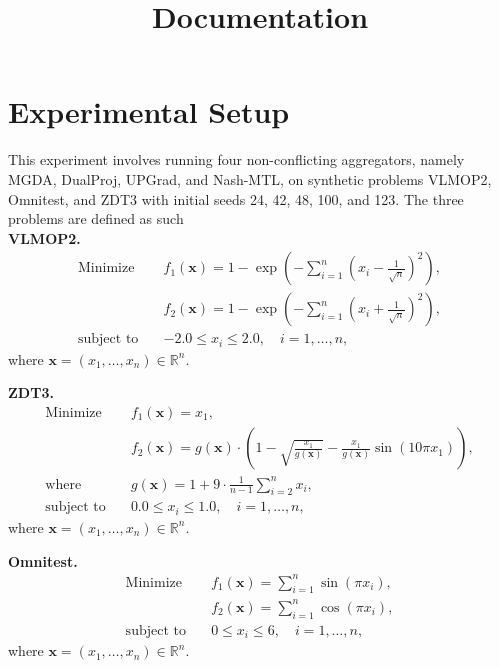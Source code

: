 \documentclass{article}
\title{Documentation}
\renewcommand{\|}{\biggr|}
\begin{document}
\maketitle
    \section{Experimental Setup}
    This experiment involves running four non-conflicting aggregators, namely MGDA, DualProj, UPGrad, and Nash-MTL, on synthetic problems VLMOP2, Omnitest, and ZDT3 with initial seeds 24, 42, 48, 100, and 123. The three problems are defined as such\\
    \textbf{VLMOP2.} 
    \begin{align*}
    \text{Minimize} \quad & f_1(\mathbf{x}) = 1 - \exp\left(-\sum_{i=1}^n \left(x_i - \frac{1}{\sqrt{n}}\right)^2\right), \\
    & f_2(\mathbf{x}) = 1 - \exp\left(-\sum_{i=1}^n \left(x_i + \frac{1}{\sqrt{n}}\right)^2\right), \\
    \text{subject to} \quad & -2.0 \leq x_i \leq 2.0, \quad i = 1, \dots, n,
    \end{align*}
    where \(\mathbf{x} = (x_1, \dots, x_n) \in \mathbb{R}^n\).

    \textbf{ZDT3.} 
    \begin{align*}
    \text{Minimize} \quad & f_1(\mathbf{x}) = x_1, \\
    & f_2(\mathbf{x}) = g(\mathbf{x}) \cdot \left(1 - \sqrt{\frac{x_1}{g(\mathbf{x})}} - \frac{x_1}{g(\mathbf{x})} \sin(10\pi x_1)\right), \\
    \text{where} \quad & g(\mathbf{x}) = 1 + 9 \cdot \frac{1}{n-1} \sum_{i=2}^n x_i, \\
    \text{subject to} \quad & 0.0 \leq x_i \leq 1.0, \quad i = 1, \dots, n,
    \end{align*}
    where \(\mathbf{x} = (x_1, \dots, x_n) \in \mathbb{R}^n\).

    \textbf{Omnitest.} 
    \begin{align*}
    \text{Minimize} \quad & f_1(\mathbf{x}) = \sum_{i=1}^n \sin(\pi x_i), \\
    & f_2(\mathbf{x}) = \sum_{i=1}^n \cos(\pi x_i), \\
    \text{subject to} \quad & 0 \leq x_i \leq 6, \quad i = 1, \dots, n,
    \end{align*}
    where \(\mathbf{x} = (x_1, \dots, x_n) \in \mathbb{R}^n\).
    
\end{document}
